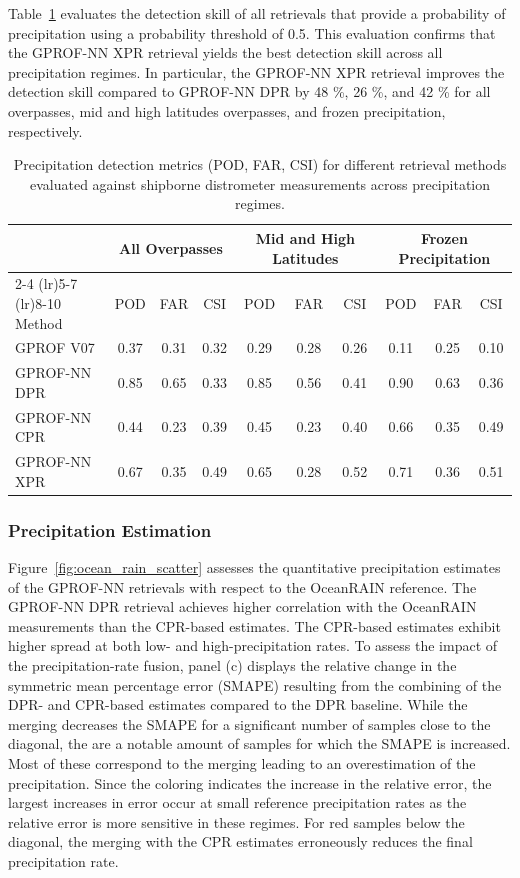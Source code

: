 \documentclass{ametsocV6.1}
\begin{document}
Table~\ref{tab:detection_metrics} evaluates the detection skill of all
retrievals that provide a probability of precipitation using a probability
threshold of 0.5. This evaluation confirms that the GPROF-NN XPR retrieval
yields the best detection skill across all precipitation regimes. In particular,
the GPROF-NN XPR retrieval improves the detection skill compared to GPROF-NN DPR
by 48 \%, 26 \%, and 42 \% for all overpasses, mid and high latitudes
overpasses, and frozen precipitation, respectively.


\begin{table}[t]
\centering
\caption{Precipitation detection metrics (POD, FAR, CSI) for different retrieval methods evaluated against shipborne distrometer measurements across precipitation regimes.}
\label{tab:detection_metrics}
\begin{tabular}{lccccccccc}
\toprule
& \multicolumn{3}{c}{All Overpasses} 
& \multicolumn{3}{c}{Mid and High Latitudes} 
& \multicolumn{3}{c}{Frozen Precipitation} \\
\cmidrule(lr){2-4} \cmidrule(lr){5-7} \cmidrule(lr){8-10}
Method 
& POD & FAR & CSI 
& POD & FAR & CSI 
& POD & FAR & CSI \\
\midrule
GPROF V07    & 0.37 & 0.31 & 0.32 & 0.29 & 0.28 & 0.26 & 0.11 & 0.25 & 0.10 \\
GPROF-NN DPR & 0.85 & 0.65 & 0.33 & 0.85 & 0.56 & 0.41 & 0.90 & 0.63 & 0.36 \\
GPROF-NN CPR & 0.44 & 0.23 & 0.39 & 0.45 & 0.23 & 0.40 & 0.66 & 0.35 & 0.49 \\
GPROF-NN XPR & 0.67 & 0.35 & 0.49 & 0.65 & 0.28 & 0.52 & 0.71 & 0.36 & 0.51 \\
\bottomrule
\end{tabular}
\end{table}

\subsubsection*{Precipitation Estimation}

Figure~\ref{fig:ocean_rain_scatter} assesses the quantitative precipitation
estimates of the GPROF-NN retrievals with respect to the OceanRAIN reference.
The GPROF-NN DPR retrieval achieves higher correlation with the OceanRAIN
measurements than the CPR-based estimates. The CPR-based estimates exhibit
higher spread at both low- and high-precipitation rates. To assess the impact of
the precipitation-rate fusion, panel (c) displays the relative change in the
symmetric mean percentage error (SMAPE) resulting from the combining of the DPR-
and CPR-based estimates compared to the DPR baseline. While the merging
decreases the SMAPE for a significant number of samples close to the diagonal,
the are a notable amount of samples for which the SMAPE is increased. Most of
these correspond to the merging leading to an overestimation of the
precipitation. Since the coloring indicates the increase in the relative error,
the largest increases in error occur at small reference precipitation rates as
the relative error is more sensitive in these regimes. For red samples below the
diagonal, the merging with the CPR estimates erroneously reduces the final
precipitation rate.
\end{document}
